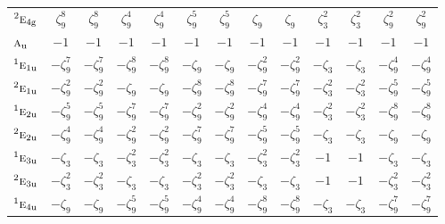 \documentclass[10pt,a4paper]{article}
\numberwithin{equation}{section}
\newcommand{\irr}[1]{\text{\normalfont\scshape #1}}
\newcommand{\conjpair}[1]{{}^{#1}}
\newcommand{\ptag}[1]{\mathrm{#1}}
\newcommand{\rootunity}[1]{\zeta_{#1}}
\begin{document}
{\begin{longtable}{@{}lcccccccccccc@{}}
$\conjpair{2}\irr{e}_{4\ptag{g}}$ & $\rootunity{9}^{8}$ & $\rootunity{9}^{8}$ & $\rootunity{9}^{4}$ & $\rootunity{9}^{4}$ & $\rootunity{9}^{5}$ & $\rootunity{9}^{5}$ & $\rootunity{9}$ & $\rootunity{9}$ & $\rootunity{3}^{2}$ & $\rootunity{3}^{2}$ & $\rootunity{9}^{2}$ & $\rootunity{9}^{2}$\\
$\irr{a}_{\ptag{u}}$ & $-1$ & $-1$ & $-1$ & $-1$ & $-1$ & $-1$ & $-1$ & $-1$ & $-1$ & $-1$ & $-1$ & $-1$\\
$\conjpair{1}\irr{e}_{1\ptag{u}}$ & $-\rootunity{9}^{7}$ & $-\rootunity{9}^{7}$ & $-\rootunity{9}^{8}$ & $-\rootunity{9}^{8}$ & $-\rootunity{9}$ & $-\rootunity{9}$ & $-\rootunity{9}^{2}$ & $-\rootunity{9}^{2}$ & $-\rootunity{3}$ & $-\rootunity{3}$ & $-\rootunity{9}^{4}$ & $-\rootunity{9}^{4}$\\
$\conjpair{2}\irr{e}_{1\ptag{u}}$ & $-\rootunity{9}^{2}$ & $-\rootunity{9}^{2}$ & $-\rootunity{9}$ & $-\rootunity{9}$ & $-\rootunity{9}^{8}$ & $-\rootunity{9}^{8}$ & $-\rootunity{9}^{7}$ & $-\rootunity{9}^{7}$ & $-\rootunity{3}^{2}$ & $-\rootunity{3}^{2}$ & $-\rootunity{9}^{5}$ & $-\rootunity{9}^{5}$\\
$\conjpair{1}\irr{e}_{2\ptag{u}}$ & $-\rootunity{9}^{5}$ & $-\rootunity{9}^{5}$ & $-\rootunity{9}^{7}$ & $-\rootunity{9}^{7}$ & $-\rootunity{9}^{2}$ & $-\rootunity{9}^{2}$ & $-\rootunity{9}^{4}$ & $-\rootunity{9}^{4}$ & $-\rootunity{3}^{2}$ & $-\rootunity{3}^{2}$ & $-\rootunity{9}^{8}$ & $-\rootunity{9}^{8}$\\
$\conjpair{2}\irr{e}_{2\ptag{u}}$ & $-\rootunity{9}^{4}$ & $-\rootunity{9}^{4}$ & $-\rootunity{9}^{2}$ & $-\rootunity{9}^{2}$ & $-\rootunity{9}^{7}$ & $-\rootunity{9}^{7}$ & $-\rootunity{9}^{5}$ & $-\rootunity{9}^{5}$ & $-\rootunity{3}$ & $-\rootunity{3}$ & $-\rootunity{9}$ & $-\rootunity{9}$\\
$\conjpair{1}\irr{e}_{3\ptag{u}}$ & $-\rootunity{3}$ & $-\rootunity{3}$ & $-\rootunity{3}^{2}$ & $-\rootunity{3}^{2}$ & $-\rootunity{3}$ & $-\rootunity{3}$ & $-\rootunity{3}^{2}$ & $-\rootunity{3}^{2}$ & $-1$ & $-1$ & $-\rootunity{3}$ & $-\rootunity{3}$\\
$\conjpair{2}\irr{e}_{3\ptag{u}}$ & $-\rootunity{3}^{2}$ & $-\rootunity{3}^{2}$ & $-\rootunity{3}$ & $-\rootunity{3}$ & $-\rootunity{3}^{2}$ & $-\rootunity{3}^{2}$ & $-\rootunity{3}$ & $-\rootunity{3}$ & $-1$ & $-1$ & $-\rootunity{3}^{2}$ & $-\rootunity{3}^{2}$\\
$\conjpair{1}\irr{e}_{4\ptag{u}}$ & $-\rootunity{9}$ & $-\rootunity{9}$ & $-\rootunity{9}^{5}$ & $-\rootunity{9}^{5}$ & $-\rootunity{9}^{4}$ & $-\rootunity{9}^{4}$ & $-\rootunity{9}^{8}$ & $-\rootunity{9}^{8}$ & $-\rootunity{3}$ & $-\rootunity{3}$ & $-\rootunity{9}^{7}$ & $-\rootunity{9}^{7}$\\

\end{longtable}}
\end{document}
